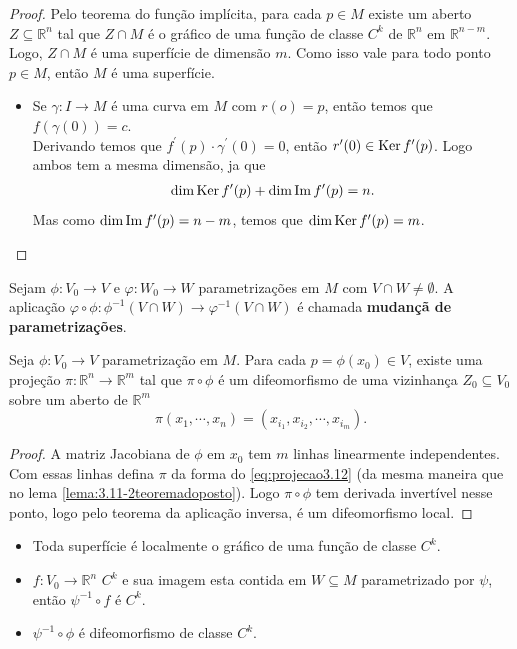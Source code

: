 \begin{proof} 
  Pelo teorema do função implícita, para cada $p\in M$ existe um aberto $Z\subseteq \mathbb{R}^{n}$ tal que $Z\cap M$ é o gráfico de uma função de classe $C^{k}$ de $\mathbb{R}^{n}$ em $\mathbb{R}^{n-m}$. Logo, $Z\cap M$ é uma superfície de dimensão $m$. Como isso vale para todo ponto $p\in M$, então $M$ é uma superfície.
  \begin{itemize}
    \item Se $\gamma:I\to M$ é uma curva em $M$ com $r(o)=p$, então temos que $f(\gamma(0))=c$.\\
      Derivando temos que $f^{\prime}(p)\cdot \gamma^{\prime}(0)=0$, então $r^{\prime}(0)\in \operatorname{Ker} f^{\prime}(p)$. Logo ambos tem a mesma dimensão, ja que
      \begin{align*}
        \dim \operatorname{Ker} f^{\prime}(p)+\dim\operatorname{Im} f^{\prime}(p)=n.
      \end{align*}
      Mas como $\dim\operatorname{Im} f^{\prime}(p)=n-m$, temos que $\dim\operatorname{Ker} f^{\prime}(p)=m$.
  \end{itemize}
\end{proof}
\begin{definition}
  Sejam $\phi:V_0\to V$ e $\varphi:W_0\to W$ parametrizações em $M$ com $V\cap W\neq \emptyset$. A aplicação $\varphi\circ\phi:\phi^{-1}(V\cap W)\to\varphi^{-1}(V\cap W)$ é chamada \textbf{mudançã de parametrizações}. 
\end{definition}
\begin{theorem}
  Seja $\phi:V_0\to V$ parametrização em $M$. Para cada $p=\phi(x_0)\in V$, existe uma projeção $\pi:\mathbb{R}^{n}\to\mathbb{R}^{m}$ tal que $\pi\circ\phi$ é um difeomorfismo de uma vizinhança $Z_0\subseteq V_0$ sobre um aberto de $\mathbb{R}^{m}$
  \begin{equation}\label{eq:projecao3.12}
    \pi(x_1,\cdots,x_n)=(x_{i_1},x_{i_{2}},\cdots,x_{i_m}).
  \end{equation}
\end{theorem}
\begin{proof} 
  A matriz Jacobiana de $\phi$ em $x_0$ tem $m$ linhas linearmente independentes. Com essas linhas defina $\pi$ da forma do \eqref{eq:projecao3.12} (da mesma maneira que no lema \ref{lema:3.11-2teoremadoposto}). Logo $\pi\circ\phi$ tem derivada invertível nesse ponto, logo pelo teorema da aplicação inversa, é um difeomorfismo local. 
\end{proof}
\begin{note}
  \phantom{xxx}
  \begin{itemize}
    \item Toda superfície é localmente o gráfico de uma função de classe $C^{k}$.
    \item $f:V_0\to\mathbb{R}^{n}$ $C^{k}$ e sua imagem esta contida em $W\subseteq M$ parametrizado por $\psi$, então $\psi^{-1}\circ f$ é $C^{k}$.
    \item $\psi^{-1}\circ \phi$ é difeomorfismo de classe $C^{k}$. 
  \end{itemize}
\end{note}
